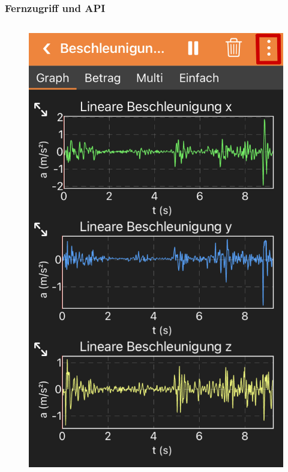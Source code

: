 \documentclass{beamer}
\begin{document}
\begin{frame}
    \frametitle{Fernzugriff und API}
    \begin{columns}
        \begin{figure}[htpb]
            \centering
            \includegraphics[width=1\textwidth]{fernzugriff1}
        \end{figure}


\end{columns}
\end{frame}
\end{document}
